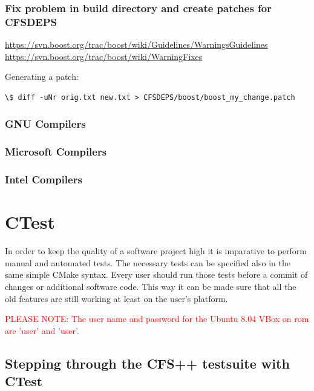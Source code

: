 \subsubsection{Fix problem in build directory and create patches for CFSDEPS}
\url{https://svn.boost.org/trac/boost/wiki/Guidelines/WarningsGuidelines}
\url{https://svn.boost.org/trac/boost/wiki/WarningFixes}

Generating a patch:
\begin{verbatim}
\$ diff -uNr orig.txt new.txt > CFSDEPS/boost/boost_my_change.patch
\end{verbatim}

\subsubsection{GNU  Compilers}  
\subsubsection{Microsoft  Compilers}   
\subsubsection{Intel  Compilers} 


\section{CTest}

In order to  keep the quality of  a software project high it  is imparative to
perform manual and automated tests.  The necessary tests can be specified also
in the same  simple CMake syntax.  Every user should run  those tests before a
commit of  changes or additional software code.  This way it can  be made sure
that all the old features are still working at least on the user's platform.

\textcolor{red}{PLEASE NOTE:  The user name  and password for the  Ubuntu 8.04
VBox on rom are 'user' and 'user'.}

\subsection{Stepping through the CFS++ testsuite with CTest}

